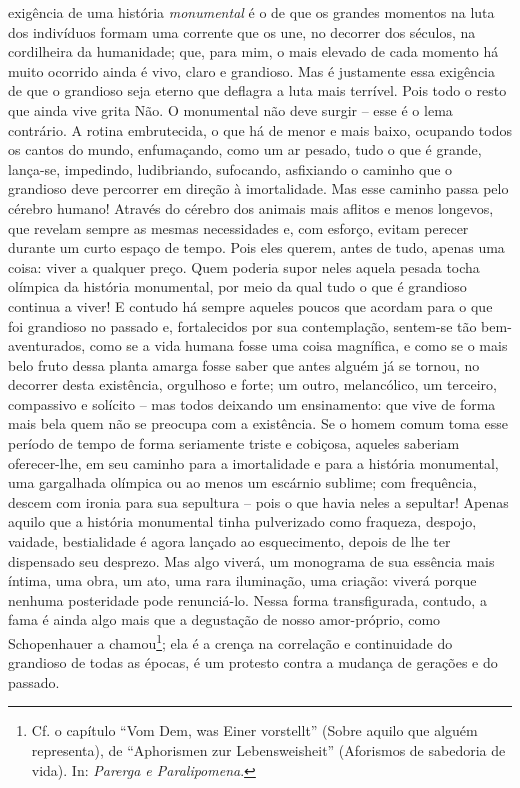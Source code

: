 exigência de uma história \emph{monumental} é o de que os grandes
momentos na luta dos indivíduos formam uma corrente que os une, no
decorrer dos séculos, na cordilheira da humanidade; que, para mim, o
mais elevado de cada momento há muito ocorrido ainda é vivo, claro e
grandioso. Mas é justamente essa exigência de que o grandioso seja
eterno que deflagra a luta mais terrível. Pois todo o resto que ainda
vive grita Não. O monumental não deve surgir -- esse é o lema contrário.
A rotina embrutecida, o que há de menor e mais baixo, ocupando todos os
cantos do mundo, enfumaçando, como um ar pesado, tudo o que é grande,
lança-se, impedindo, ludibriando, sufocando, asfixiando o caminho que o
grandioso deve percorrer em direção à imortalidade. Mas esse caminho
passa pelo cérebro humano! Através do cérebro dos animais mais aflitos e
menos longevos, que revelam sempre as mesmas necessidades e, com
esforço, evitam perecer durante um curto espaço de tempo. Pois eles
querem, antes de tudo, apenas uma coisa: viver a qualquer preço. Quem
poderia supor neles aquela pesada tocha olímpica da história monumental,
por meio da qual tudo o que é grandioso continua a viver! E contudo há
sempre aqueles poucos que acordam para o que foi grandioso no passado e,
fortalecidos por sua contemplação, sentem-se tão bem-aventurados, como
se a vida humana fosse uma coisa magnífica, e como se o mais belo fruto
dessa planta amarga fosse saber que antes alguém já se tornou, no
decorrer desta existência, orgulhoso e forte; um outro, melancólico, um
terceiro, compassivo e solícito -- mas todos deixando um ensinamento:
que vive de forma mais bela quem não se preocupa com a existência. Se o
homem comum toma esse período de tempo de forma seriamente triste e
cobiçosa, aqueles saberiam oferecer-lhe, em seu caminho para a
imortalidade e para a história monumental, uma gargalhada olímpica ou ao
menos um escárnio sublime; com frequência, descem com ironia para sua
sepultura -- pois o que havia neles a sepultar! Apenas aquilo que a
história monumental tinha pulverizado como fraqueza, despojo, vaidade,
bestialidade é agora lançado ao esquecimento, depois de lhe ter
dispensado seu desprezo. Mas algo viverá, um monograma de sua essência
mais íntima, uma obra, um ato, uma rara iluminação, uma criação: viverá
porque nenhuma posteridade pode renunciá-lo. Nessa forma transfigurada,
contudo, a fama é ainda algo mais que a degustação de nosso
amor-próprio, como Schopenhauer a chamou\footnote{Cf. o capítulo ``Vom
  Dem, was Einer vorstellt'' (Sobre aquilo que alguém representa), de
  ``Aphorismen zur Lebensweisheit'' (Aforismos de sabedoria de vida).
  In: \emph{Parerga e Paralipomena}.}; ela é a crença na correlação e
continuidade do grandioso de todas as épocas, é um protesto contra a
mudança de gerações e do passado.

